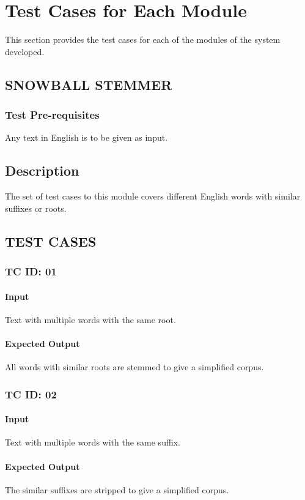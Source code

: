 
\chapter{Test Cases for Each Module}
This section provides the test cases for each of the modules of the system developed.

\section{SNOWBALL STEMMER}
\subsection{Test Pre-requisites}
Any text in English is to be given as input. 

\section{Description}
The set of test cases to this module covers different English words with similar suffixes or roots.

\section{TEST CASES}
\subsection{TC ID: 01}
\subsubsection{Input}
Text with multiple words with the same root. 
\subsubsection{Expected Output}
All words with similar roots are stemmed to give a simplified corpus.

\subsection{TC ID: 02}
\subsubsection{Input}
Text with multiple words with the same suffix.  
\subsubsection{Expected Output}
The similar suffixes are stripped to give a simplified corpus.

